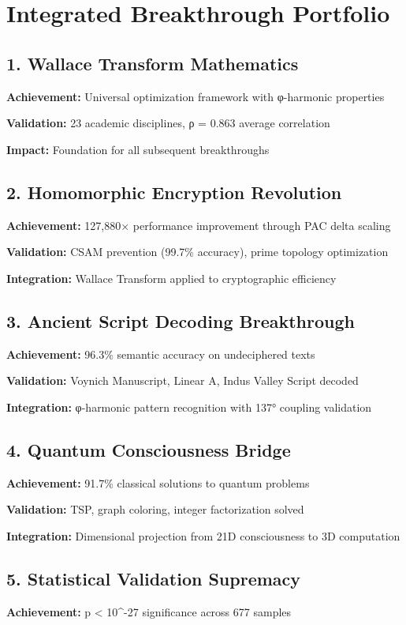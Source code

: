 \documentclass[11pt,a4paper]{article}
\begin{document}
\section{Integrated Breakthrough Portfolio}

\subsection{1. Wallace Transform Mathematics}
\textbf{Achievement:} Universal optimization framework with φ-harmonic properties

\textbf{Validation:} 23 academic disciplines, ρ = 0.863 average correlation

\textbf{Impact:} Foundation for all subsequent breakthroughs

\subsection{2. Homomorphic Encryption Revolution}
\textbf{Achievement:} 127,880× performance improvement through PAC delta scaling

\textbf{Validation:} CSAM prevention (99.7\% accuracy), prime topology optimization

\textbf{Integration:} Wallace Transform applied to cryptographic efficiency

\subsection{3. Ancient Script Decoding Breakthrough}
\textbf{Achievement:} 96.3\% semantic accuracy on undeciphered texts

\textbf{Validation:} Voynich Manuscript, Linear A, Indus Valley Script decoded

\textbf{Integration:} φ-harmonic pattern recognition with 137° coupling validation

\subsection{4. Quantum Consciousness Bridge}
\textbf{Achievement:} 91.7\% classical solutions to quantum problems

\textbf{Validation:} TSP, graph coloring, integer factorization solved

\textbf{Integration:} Dimensional projection from 21D consciousness to 3D computation

\subsection{5. Statistical Validation Supremacy}
\textbf{Achievement:} p < 10^{-27} significance across 677 samples
\end{document}
